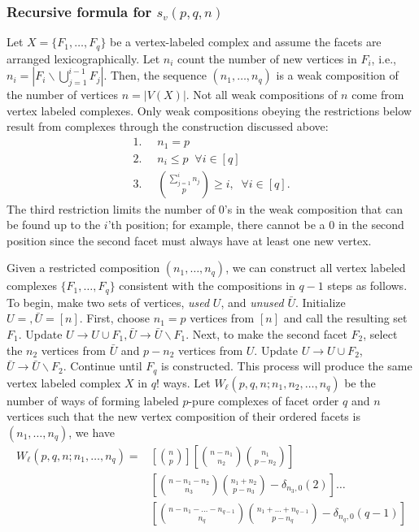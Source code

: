 \documentclass[12pt]{article}
\theoremstyle{plain}
\theoremstyle{definition}
\theoremstyle{remark}
\newcommand{\CR}{\nonumber\\}
\begin{document}
\subsubsection{Recursive formula for $s_v(p,q,n)$}
Let $X=\{F_1,\dots,F_q\}$ be a vertex-labeled complex and assume the facets are arranged lexicographically. Let $n_i$ count the number of new vertices in $F_i$, i.e., $n_i = |F_i\backslash\bigcup_{j=1}^{i-1}F_j|$. Then, the sequence $(n_1,\dots,n_q)$ is a weak composition of the number of vertices $n = |V(X)|$. Not all weak compositions of $n$ come from vertex labeled complexes. Only weak compositions obeying the restrictions below result from complexes through the construction discussed above:  
\begin{align}
\label{eq:restrictedCompositions}
    1.\;\;& n_1=p\CR
    2.\;\;& n_i \le p \;\;\forall i\in[q]\CR
    3.\;\;&\binom{\sum_{j=1}^i n_j}{p}\ge i ,\;\;\forall i\in[q]. 
\end{align}
The third restriction limits the number of 0's in the weak composition that can be found up to the $i$'th position; for example, there cannot be a 0 in the second position since the second facet must always have at least one new vertex.

Given a restricted composition $(n_1,\dots,n_q)$, we can construct all vertex labeled complexes $\{F_1,\dots,F_q\}$ consistent with the compositions in $q-1$ steps as follows. To begin, make two sets of vertices, {\em used} $U$, and {\em unused} $\bar U$. Initialize $U = {}, \bar U = [n]$. First, choose $n_1=p$ vertices from $[n]$ and call the resulting set $F_1$. Update $U \rightarrow U\cup F_1, \bar U \rightarrow \bar U\backslash F_1$. Next, to make the second facet $F_2$, select the $n_2$ vertices from $\bar U$ and $p-n_2$ vertices from $U$. Update $U\rightarrow U\cup F_2$, $\bar U\rightarrow \bar U\backslash F_2$. Continue until $F_q$ is constructed. This process will produce the same vertex labeled complex $X$ in $q!$ ways. Let $W_\ell(p,q,n;n_1,n_2,\dots,n_q)$ be the number of ways of forming labeled $p$-pure complexes of facet order $q$ and $n$ vertices such that the new vertex composition of their ordered facets is $(n_1,\dots,n_q)$, we have
\begin{align}
    W_\ell(p,q,n;n_1,\dots,n_q)=&\left[\binom{n}{p}\right]\left[\binom{n-n_1}{n_2}\binom{n_1}{p-n_2}\right]\CR
    &\left[\binom{n-n_1-n_2}{n_3}\binom{n_1+n_2}{p-n_3}-\delta_{n_3,0}(2)\right]\dots\CR
    &\left[\binom{n-n_1-\dots-n_{q-1}}{n_q}\binom{n_1+\dots+n_{q-1}}{p-n_q}-\delta_{n_q,0}(q-1)\right]
\end{align}
\end{document}
